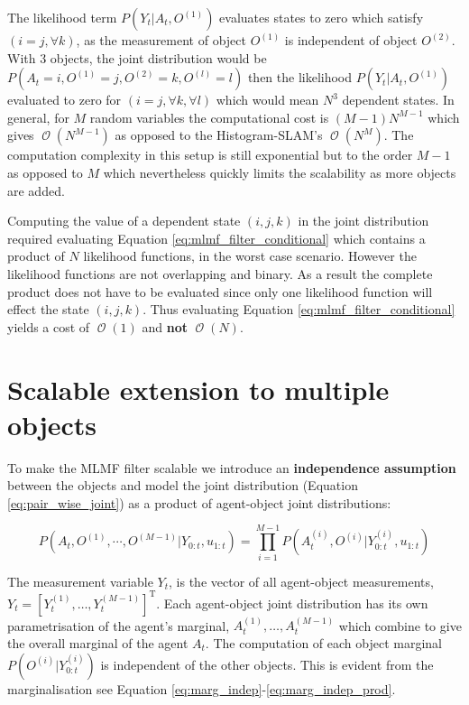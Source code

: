 \documentclass{frontiersSCNS} %
\DeclareMathOperator{\BigO}{\mathcal{O}}
\begin{document}
The likelihood term $P(Y_t|A_t,O^{(1)})$ evaluates states to zero which satisfy ${(i=j,\forall k)}$, as 
the measurement of object $O^{(1)}$ is independent of object $O^{(2)}$. With 3 objects, the joint distribution would be
${P(A_t=i,O^{(1)}=j,O^{(2)}=k,O^{(l)}=l)}$ then the likelihood $P(Y_t|A_t,O^{(1)})$  evaluated to 
zero for ${(i=j,\forall k,\forall l)}$ which would mean $N^3$ dependent states.
In general, for $M$ random variables the computational cost is $(M-1) N^{M-1}$ which gives $\BigO(N^{M-1})$ as opposed to the Histogram-SLAM's $\BigO(N^M)$. 
The computation complexity in this setup is still exponential but to the order $M-1$ as opposed to $M$ which nevertheless 
quickly limits the scalability as more objects are added. 

Computing the value of a dependent state ${(i,j,k)}$ in the joint distribution required evaluating Equation \ref{eq:mlmf_filter_conditional} which
contains a product of $N$ likelihood functions, in the worst case scenario. However the likelihood functions are not overlapping and binary. As a result the complete product
does not have to be evaluated since only one likelihood function will effect the state ${(i,j,k)}$. Thus evaluating Equation \ref{eq:mlmf_filter_conditional}
yields a cost of $\BigO(1)$ and \textbf{not} $\BigO(N)$.

\section{Scalable extension to multiple objects}\label{subsec:scalabe_extension}

To make the MLMF filter scalable we introduce an \textbf{independence assumption} between the objects and model 
the joint distribution (Equation \ref{eq:pair_wise_joint}) as a product of agent-object joint distributions:

\begin{equation}\label{eq:pair_wise_joint}
 P(A_t,O^{(1)},\cdots,O^{(M-1)}|Y_{0:t},u_{1:t}) = \prod\limits_{i=1}^{M-1} P(A^{(i)}_t,O^{(i)}|Y^{(i)}_{0:t},u_{1:t})
\end{equation}

The measurement variable $Y_t$, is the vector of all agent-object 
measurements, $Y_t = \left[Y^{(1)}_t,\dots,Y^{(M-1)}_t\right]^{\mathrm{T}}$. Each agent-object joint distribution has its own parametrisation of the agent's marginal,
$A^{(1)}_t,\dots,A^{(M-1)}_t$ which combine to give the overall marginal of the agent $A_t$. The computation of each object marginal $P(O^{(i)}|Y^{(i)}_{0:t})$ is independent of the other objects. This is evident from the marginalisation 
see Equation \ref{eq:marg_indep}-\ref{eq:marg_indep_prod}.
\end{document}
